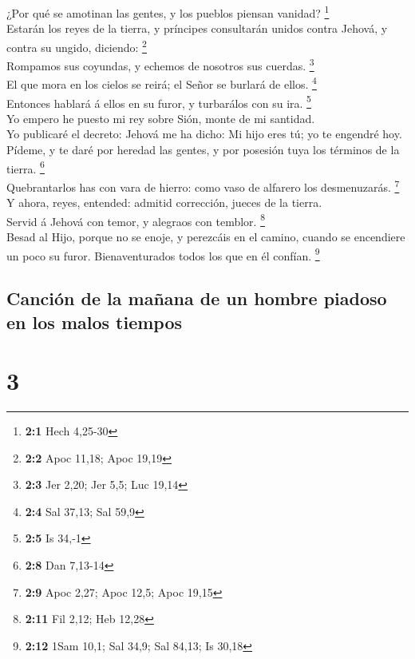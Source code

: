  ¿Por qué se amotinan las gentes, y los pueblos piensan
vanidad? \footnote{\textbf{2:1} Hech 4,25-30}\\
 Estarán los reyes de la tierra, y príncipes consultarán
unidos contra Jehová, y contra su ungido, diciendo: \footnote{\textbf{2:2}
  Apoc 11,18; Apoc 19,19}\\
 Rompamos sus coyundas, y echemos de nosotros sus cuerdas.
\footnote{\textbf{2:3} Jer 2,20; Jer 5,5; Luc 19,14}\\
 El que mora en los cielos se reirá; el Señor se burlará
de ellos. \footnote{\textbf{2:4} Sal 37,13; Sal 59,9}\\
 Entonces hablará á ellos en su furor, y turbarálos con su
ira. \footnote{\textbf{2:5} Is 34,-1}\\
 Yo empero he puesto mi rey sobre Sión, monte de mi
santidad.\\
 Yo publicaré el decreto: Jehová me ha dicho: Mi hijo eres
tú; yo te engendré hoy.\\
 Pídeme, y te daré por heredad las gentes, y por posesión
tuya los términos de la tierra. \footnote{\textbf{2:8} Dan 7,13-14}\\
 Quebrantarlos has con vara de hierro: como vaso de
alfarero los desmenuzarás. \footnote{\textbf{2:9} Apoc 2,27; Apoc 12,5;
  Apoc 19,15}\\
 Y ahora, reyes, entended: admitid corrección, jueces de
la tierra.\\
 Servid á Jehová con temor, y alegraos con temblor.
\footnote{\textbf{2:11} Fil 2,12; Heb 12,28}\\
 Besad al Hijo, porque no se enoje, y perezcáis en el
camino, cuando se encendiere un poco su furor. Bienaventurados todos los
que en él confían. \footnote{\textbf{2:12} 1Sam 10,1; Sal 34,9; Sal
  84,13; Is 30,18}

\hypertarget{canciuxf3n-de-la-mauxf1ana-de-un-hombre-piadoso-en-los-malos-tiempos}{%
\subsection{Canción de la mañana de un hombre piadoso en los malos
tiempos}\label{canciuxf3n-de-la-mauxf1ana-de-un-hombre-piadoso-en-los-malos-tiempos}}

\hypertarget{section-2}{%
\section{3}\label{section-2}}

